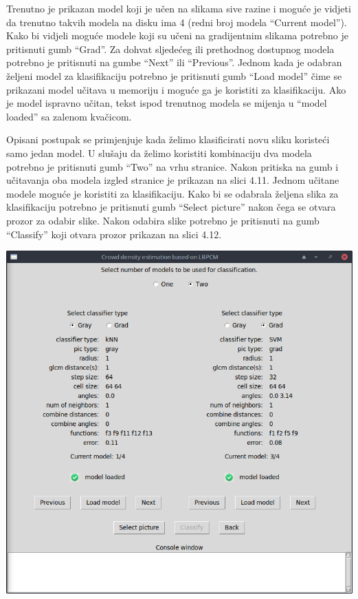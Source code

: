 \documentclass[times, utf8, zavrsni]{fer}
\begin{document}
\bigbreak 

Trenutno je prikazan model koji je učen na slikama sive razine i moguće
je vidjeti da trenutno takvih modela na disku ima 4 (redni broj modela
\enquote{Current model}). Kako bi vidjeli moguće modele koji su učeni na
gradijentnim slikama potrebno je pritisnuti gumb \enquote{Grad}. Za dohvat
sljedećeg ili prethodnog dostupnog modela potrebno je pritisnuti na 
gumbe \enquote{Next} ili \enquote{Previous}. Jednom kada je odabran željeni
model za klasifikaciju potrebno je pritisnuti gumb \enquote{Load model} čime
se prikazani model učitava u memoriju i moguće ga je koristiti za klasifikaciju.
Ako je model ispravno učitan, tekst ispod trenutnog modela se mijenja
u \enquote{model loaded} sa zalenom kvačicom.

\bigbreak

Opisani postupak se primjenjuje kada želimo klasificirati novu sliku
koristeći samo jedan model. U slušaju da želimo koristiti kombinaciju
dva modela potrebno je pritisnuti gumb \enquote{Two} na vrhu stranice.
Nakon pritiska na gumb i učitavanja oba modela izgled stranice je prikazan
na slici 4.11. Jednom učitane modele moguće je koristiti za klasifikaciju. Kako
bi se odabrala željena slika za klasifikaciju potrebno je pritisnuti 
gumb \enquote{Select picture} nakon čega se otvara prozor za odabir slike.
Nakon odabira slike potrebno je pritisnuti na gumb \enquote{Classify} koji 
otvara prozor prikazan na slici 4.12.

\bigbreak 

\begin{minipage}{\linewidth}
\centering
\includegraphics[scale=0.4]{img/cl2.png}
\end{minipage}
\end{document}
